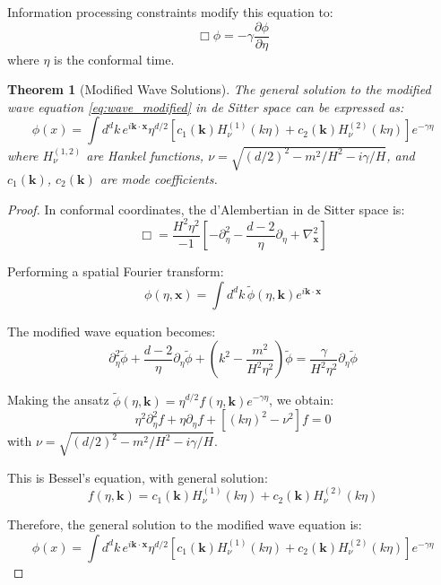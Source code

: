 \documentclass[11pt,english,twoside]{article}
\theoremstyle{plain}
\newtheorem{theorem}{Theorem}[section]
\theoremstyle{definition}
\theoremstyle{remark}
\newcommand{\gammaR}{\gamma}
\newcommand{\xb}{\mathbf{x}}
\newcommand{\kb}{\mathbf{k}}
\begin{document}
Information processing constraints modify this equation to:
\begin{equation}
\label{eq:wave_modified}
\Box \phi = -\gammaR \frac{\partial\phi}{\partial\eta}
\end{equation}
where $\eta$ is the conformal time.

\begin{theorem}[Modified Wave Solutions]
\label{thm:modified_wave}
The general solution to the modified wave equation \eqref{eq:wave_modified} in de Sitter space can be expressed as:
\begin{equation}
\phi(x) = \int d^dk \, e^{i\kb\cdot\xb} \eta^{d/2} \left[c_1(\kb) H_\nu^{(1)}(k\eta) + c_2(\kb) H_\nu^{(2)}(k\eta)\right] e^{-\gammaR\eta}
\end{equation}
where $H_\nu^{(1,2)}$ are Hankel functions, $\nu = \sqrt{(d/2)^2 - m^2/H^2 - i\gammaR/H}$, and $c_1(\kb)$, $c_2(\kb)$ are mode coefficients.
\end{theorem}

\begin{proof}
In conformal coordinates, the d'Alembertian in de Sitter space is:
\begin{equation}
\Box = \frac{H^2\eta^2}{-1}\left[-\partial_\eta^2 - \frac{d-2}{\eta}\partial_\eta + \nabla_{\xb}^2\right]
\end{equation}

Performing a spatial Fourier transform:
\begin{equation}
\phi(\eta,\xb) = \int d^dk \, \tilde{\phi}(\eta,\kb) e^{i\kb\cdot\xb}
\end{equation}

The modified wave equation becomes:
\begin{equation}
\partial_\eta^2\tilde{\phi} + \frac{d-2}{\eta}\partial_\eta\tilde{\phi} + \left(k^2 - \frac{m^2}{H^2\eta^2}\right)\tilde{\phi} = \frac{\gammaR}{H^2\eta^2}\partial_\eta\tilde{\phi}
\end{equation}

Making the ansatz $\tilde{\phi}(\eta,\kb) = \eta^{d/2}f(\eta,\kb)e^{-\gammaR\eta}$, we obtain:
\begin{equation}
\eta^2\partial_\eta^2 f + \eta\partial_\eta f + \left[(k\eta)^2 - \nu^2\right]f = 0
\end{equation}
with $\nu = \sqrt{(d/2)^2 - m^2/H^2 - i\gammaR/H}$.

This is Bessel's equation, with general solution:
\begin{equation}
f(\eta,\kb) = c_1(\kb) H_\nu^{(1)}(k\eta) + c_2(\kb) H_\nu^{(2)}(k\eta)
\end{equation}

Therefore, the general solution to the modified wave equation is:
\begin{equation}
\phi(x) = \int d^dk \, e^{i\kb\cdot\xb} \eta^{d/2} \left[c_1(\kb) H_\nu^{(1)}(k\eta) + c_2(\kb) H_\nu^{(2)}(k\eta)\right] e^{-\gammaR\eta}
\end{equation}
\end{proof}
\end{document}
